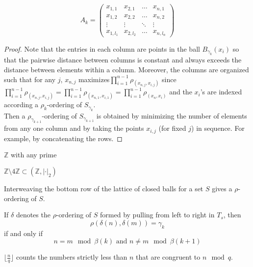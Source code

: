 \[A_k=
 \begin{pmatrix}
  x_{1,1} & x_{2,1} & \ldots  &x_{n,1} \\
  x_{1,2} & x_{2,2} &\ldots &x_{n,2} \\
  \vdots & \vdots & \ddots & \vdots \\
  x_{1,l_1} & x_{2,l_2} & \ldots &x_{n,l_n}
 \end{pmatrix}
\]


\begin{proof}
Note that the entries in each column are points in the ball $B_{\gamma_k}(x_i)$ so that the pairwise distance between columns is constant and always exceeds the distance between elements within a column. Moreover, the columns are organized such that for any $j$, $x_{n,j}$ maximizes$\prod_{i=1}^{n-1} \rho_(x_{n,j},x_{i,j})$ since $\prod_{i=1}^{n-1} \rho_(x_{n,j},x_{i,j}) = \prod_{i=1}^{n-1} \rho_(x_{n,1},x_{i,1}) = \prod_{i=1}^{n-1} \rho_(x_{n},x_{i})$ and the $x_i$'s are indexed according a $\rho_k$-ordering of $S_{\gamma_k}$.\\

Then a $\rho_{\gamma_{k+1}}$-ordering of $S_{\gamma_{k+1}}$ is obtained by minimizing the number of elements from any one column and by taking the points $x_{i,j}$ (for fixed $j$) in sequence. For example, by concatenating the rows.
\end{proof}

\begin{example}
$\mathbb{Z}$ with any prime
\end{example}

\begin{example}
$\mathbb{Z} \setminus 4\mathbb{Z} \subset (\mathbb{Z}, \lvert \cdot \rvert_2)$
\end{example}


\begin{corollary*}
Interweaving the bottom row of the lattice of closed balls for a set $S$ gives a $\rho$-ordering of $S$. 
\end{corollary*}


\begin{lemma*}
If $\delta$ denotes the $\rho$-ordering of $S$ formed by pulling from left to right in $T_s$, then \[\rho(\delta(n),\delta(m))=\gamma_k\] if and only if \[ n=m \mod \beta(k) \text{  and } n \neq m \mod \beta(k+1)\]
\end{lemma*}

\begin{lemma*}
$\lfloor\frac{n}{q} \rfloor$ counts the numbers strictly less than $n$ that are congruent to $n \mod q$.
\end{lemma*}

